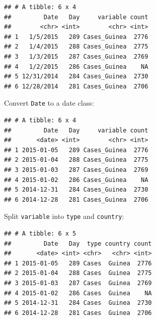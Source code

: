 \documentclass[]{book}
\makeatletter
\newenvironment{Shaded}{\begin{snugshade}}{\end{snugshade}}
\newcommand{\KeywordTok}[1]{\textcolor[rgb]{0.13,0.29,0.53}{\textbf{#1}}}
\newcommand{\DataTypeTok}[1]{\textcolor[rgb]{0.13,0.29,0.53}{#1}}
\newcommand{\StringTok}[1]{\textcolor[rgb]{0.31,0.60,0.02}{#1}}
\newcommand{\OperatorTok}[1]{\textcolor[rgb]{0.81,0.36,0.00}{\textbf{#1}}}
\newcommand{\NormalTok}[1]{#1}
\newenvironment{kframe}{%
\medskip{}
\setlength{\fboxsep}{.8em}
 \def\at@end@of@kframe{}%
 \ifinner\ifhmode%
  \def\at@end@of@kframe{\end{minipage}}%
  \begin{minipage}{\columnwidth}%
 \fi\fi%
 \def\FrameCommand##1{\hskip\@totalleftmargin \hskip-\fboxsep
 \colorbox{shadecolor}{##1}\hskip-\fboxsep
     \hskip-\linewidth \hskip-\@totalleftmargin \hskip\columnwidth}%
 \MakeFramed {\advance\hsize-\width
   \@totalleftmargin\z@ \linewidth\hsize
   \@setminipage}}%
 {\par\unskip\endMakeFramed%
 \at@end@of@kframe}
\renewenvironment{Shaded}{\begin{kframe}}{\end{kframe}}
\theoremstyle{definition}
\theoremstyle{definition}
\theoremstyle{definition}
\theoremstyle{remark}
\makeatother
\begin{document}
\begin{verbatim}
## # A tibble: 6 x 4
##         Date   Day     variable count
##        <chr> <int>        <chr> <int>
## 1   1/5/2015   289 Cases_Guinea  2776
## 2   1/4/2015   288 Cases_Guinea  2775
## 3   1/3/2015   287 Cases_Guinea  2769
## 4   1/2/2015   286 Cases_Guinea    NA
## 5 12/31/2014   284 Cases_Guinea  2730
## 6 12/28/2014   281 Cases_Guinea  2706
\end{verbatim}

Convert \texttt{Date} to a date class:

\begin{Shaded}
\end{Shaded}

\begin{verbatim}
## # A tibble: 6 x 4
##         Date   Day     variable count
##       <date> <int>        <chr> <int>
## 1 2015-01-05   289 Cases_Guinea  2776
## 2 2015-01-04   288 Cases_Guinea  2775
## 3 2015-01-03   287 Cases_Guinea  2769
## 4 2015-01-02   286 Cases_Guinea    NA
## 5 2014-12-31   284 Cases_Guinea  2730
## 6 2014-12-28   281 Cases_Guinea  2706
\end{verbatim}

Split \texttt{variable} into \texttt{type} and \texttt{country}:

\begin{Shaded}
\end{Shaded}

\begin{verbatim}
## # A tibble: 6 x 5
##         Date   Day  type country count
##       <date> <int> <chr>   <chr> <int>
## 1 2015-01-05   289 Cases  Guinea  2776
## 2 2015-01-04   288 Cases  Guinea  2775
## 3 2015-01-03   287 Cases  Guinea  2769
## 4 2015-01-02   286 Cases  Guinea    NA
## 5 2014-12-31   284 Cases  Guinea  2730
## 6 2014-12-28   281 Cases  Guinea  2706
\end{verbatim}
\end{document}
